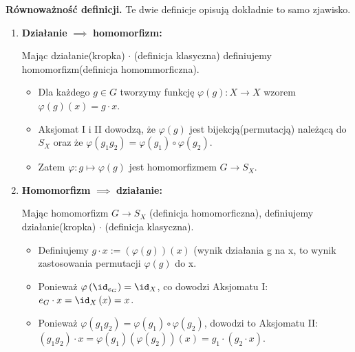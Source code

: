 \noindent\textbf{Równoważność definicji.} Te dwie definicje opisują dokładnie to samo zjawisko.
\begin{enumerate}[label=\arabic*.]
	\item \textbf{Działanie} $\implies$ \textbf{homomorfizm:}

		Mając działanie(kropka) $\cdot $ (definicja klasyczna) definiujemy homomorfizm(definicja homommorficzna).
		\begin{itemize}
			\item Dla każdego $g\in G$ tworzymy funkcję $\varphi\left( g \right): X\rightarrow X$ wzorem $\varphi\left( g \right) \left( x \right) = g\cdot x$.
			\item Aksjomat I i II dowodzą, że  $\varphi\left( g \right) $ jest bijekcją(permutacją) należącą do $S_{X}$ oraz że $\varphi\left( g_1g_2 \right) = \varphi\left( g_1 \right) \circ \varphi\left( g_2 \right) $.
			\item Zatem $\varphi : g \mapsto \varphi\left( g \right) $ jest homomorfizmem $G\rightarrow S_{X}$.
		\end{itemize}
	\item \textbf{Homomorfizm} $\implies$ \textbf{działanie:}
		
		Mając homomorfizm $G\rightarrow S_{X}$ (definicja homomorficzna), definiujemy działanie(kropka) $\cdot $ (definicja klasyczna).
		\begin{itemize}
			\item Definiujemy $g\cdot x := \left( \varphi\left( g \right)  \right)\left( x \right)$ (wynik działania g na x, to wynik zastosowania permutacji $\varphi\left( g \right) $ do x.
			\item Ponieważ $\varphi\left( \id_{e_{G}} \right) = \id_{X}$, co dowodzi Aksjomatu I: $e_{G}\cdot x = \id_{X}\left( x \right) = x$.
			\item Ponieważ $\varphi\left( g_1g_2 \right) = \varphi\left( g_1 \right) \circ \varphi\left( g_2 \right) $, dowodzi to Aksjomatu II: $\left( g_1g_2 \right) \cdot x = \varphi\left( g_1 \right) \left( \varphi\left( g_2 \right)  \right) \left( x \right) = g_1\cdot \left( g_2\cdot x \right) $.
		\end{itemize}
\end{enumerate}
